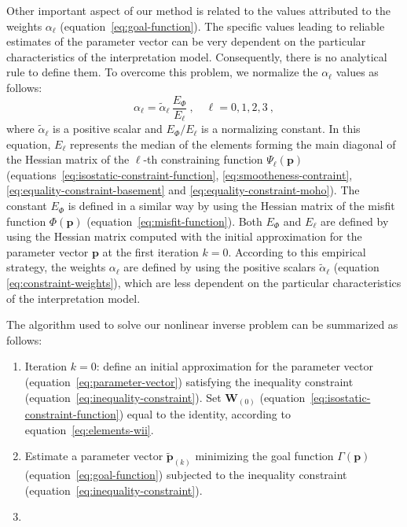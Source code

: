 \documentclass[manuscript]{geophysics}
\begin{document}
Other important aspect of our method is related to the values attributed to 
the weights $\alpha_{\ell}$ (equation~\ref{eq:goal-function}).
The specific values leading to reliable estimates of the parameter vector can be 
very dependent on the particular characteristics of the interpretation model. 
Consequently, there is no analytical rule to define them. 
To overcome this problem, we normalize the $\alpha_{\ell}$ values as follows:
\begin{equation}
\alpha_{\ell} = \tilde{\alpha}_{\ell} \, \frac{E_{\Phi}}{E_{\ell}} \: 
, \quad \ell = 0, 1, 2, 3 \: ,
\label{eq:constraint-weights}
\end{equation}
where $\tilde{\alpha}_{\ell}$ is a positive scalar and $E_{\Phi} / E_{\ell}$
is a normalizing constant. In this equation, $E_{\ell}$ represents the median 
of the elements forming the main diagonal of the Hessian matrix of the 
$\ell$-th constraining function $\Psi_{\ell}(\mathbf{p})$ 
(equations~\ref{eq:isostatic-constraint-function}, 
\ref{eq:smootheness-contraint}, \ref{eq:equality-constraint-basement} and 
\ref{eq:equality-constraint-moho}). The constant $E_{\Phi}$ is defined in 
a similar way by using the Hessian matrix of the misfit function $\Phi(\mathbf{p})$ 
(equation~\ref{eq:misfit-function}). 
Both $E_{\Phi}$ and $E_{\ell}$ are defined by using the Hessian matrix computed with 
the initial approximation for the parameter vector $\mathbf{p}$ at the first 
iteration $k = 0$.
According to this empirical strategy, the weights $\alpha_{\ell}$ are defined 
by using the positive scalars $\tilde{\alpha}_{\ell}$ 
(equation \ref{eq:constraint-weights}), which are less dependent on the particular 
characteristics of the interpretation model.

The algorithm used to solve our nonlinear inverse problem can be summarized as follows:

\begin{enumerate}
	\item Iteration $k = 0$: define an initial approximation 
	for the parameter vector (equation~\ref{eq:parameter-vector}) satisfying the 
	inequality constraint (equation~\ref{eq:inequality-constraint}). 
	Set $\mathbf{W}_{(0)}$ (equation~\ref{eq:isostatic-constraint-function}) equal to the
	identity, according to equation~\ref{eq:elements-wii}.
	
	\item Estimate a parameter vector $\tilde{\mathbf{p}}_{(k)}$ minimizing the goal function $\Gamma(\mathbf{p})$ (equation~\ref{eq:goal-function})
	subjected to the inequality constraint (equation~\ref{eq:inequality-constraint}).
	
	\item 

\end{enumerate}
\end{document}
